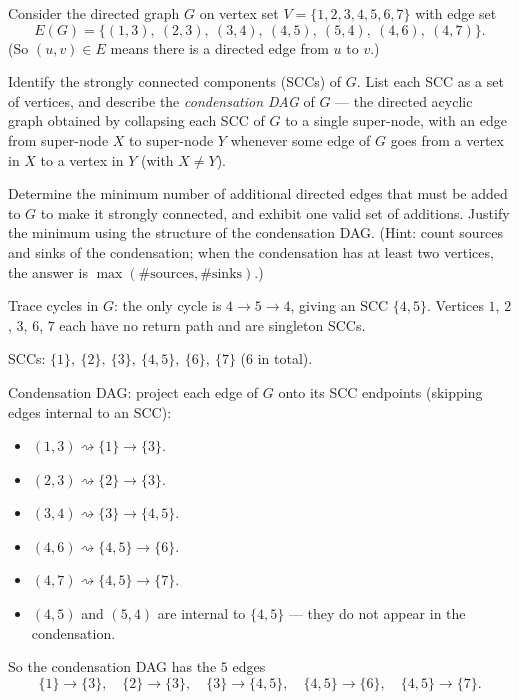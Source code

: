 \documentclass[test,letterpaper]{cs20}
\begin{document}
\begin{problem}

Consider the directed graph $G$ on vertex set $V = \{1, 2, 3, 4, 5, 6, 7\}$ with edge set
\[
E(G) = \{(1, 3),\ (2, 3),\ (3, 4),\ (4, 5),\ (5, 4),\ (4, 6),\ (4, 7)\}.
\]
(So $(u, v) \in E$ means there is a directed edge from $u$ to $v$.)

\subproblem Identify the strongly connected components (SCCs) of $G$. List each SCC as a set of vertices, and describe the \emph{condensation DAG} of $G$ --- the directed acyclic graph obtained by collapsing each SCC of $G$ to a single super-node, with an edge from super-node $X$ to super-node $Y$ whenever some edge of $G$ goes from a vertex in $X$ to a vertex in $Y$ (with $X \neq Y$).

\subproblem Determine the minimum number of additional directed edges that must be added to $G$ to make it strongly connected, and exhibit one valid set of additions. Justify the minimum using the structure of the condensation DAG. (Hint: count sources and sinks of the condensation; when the condensation has at least two vertices, the answer is $\max(\#\text{sources}, \#\text{sinks})$.)

\begin{solution}
\subsolution Trace cycles in $G$: the only cycle is $4 \to 5 \to 4$, giving an SCC $\{4, 5\}$. Vertices $1$, $2$, $3$, $6$, $7$ each have no return path and are singleton SCCs.

SCCs: $\{1\},\ \{2\},\ \{3\},\ \{4, 5\},\ \{6\},\ \{7\}$ ($6$ in total).

Condensation DAG: project each edge of $G$ onto its SCC endpoints (skipping edges internal to an SCC):
\begin{itemize}
\item $(1, 3) \rightsquigarrow \{1\} \to \{3\}$.
\item $(2, 3) \rightsquigarrow \{2\} \to \{3\}$.
\item $(3, 4) \rightsquigarrow \{3\} \to \{4, 5\}$.
\item $(4, 6) \rightsquigarrow \{4, 5\} \to \{6\}$.
\item $(4, 7) \rightsquigarrow \{4, 5\} \to \{7\}$.
\item $(4, 5)$ and $(5, 4)$ are internal to $\{4, 5\}$ --- they do not appear in the condensation.
\end{itemize}
So the condensation DAG has the $5$ edges
\[
\{1\} \to \{3\}, \quad \{2\} \to \{3\}, \quad \{3\} \to \{4, 5\}, \quad \{4, 5\} \to \{6\}, \quad \{4, 5\} \to \{7\}.
\]


\end{solution}
\end{problem}
\end{document}
